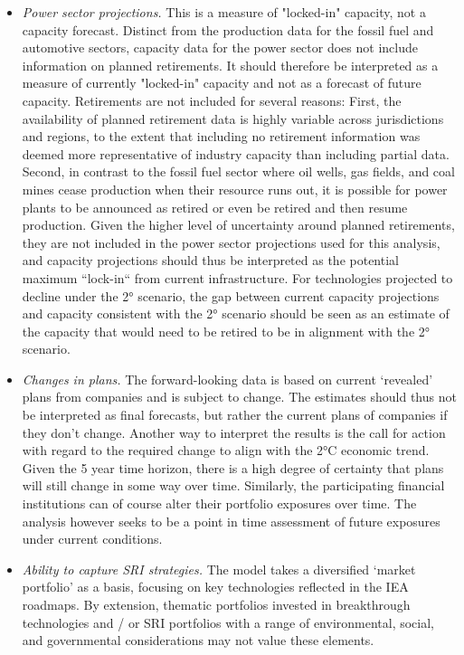 \documentclass[10pt,table,a4]{article}\usepackage[]{graphicx}\usepackage[]{color}
\begin{document}
\begin{multicols}{2}
\begin{itemize}
			\item{\textit{Power sector projections.} This is a measure of "locked-in" capacity, not a capacity forecast. Distinct from the production data for the fossil fuel and automotive sectors, capacity data for the power sector does not include information on planned retirements. It should therefore be interpreted as a measure of currently "locked-in" capacity and not as a forecast of future capacity. Retirements are not included for several reasons: First, the availability of planned retirement data is highly variable across jurisdictions and regions, to the extent that including no retirement information was deemed more representative of industry capacity than including partial data. Second, in contrast to the fossil fuel sector where oil wells, gas fields, and coal mines cease production when their resource runs out, it is possible for power plants to be announced as retired or even be retired and then resume production. Given the higher level of uncertainty around planned retirements, they are not included in the power sector projections used for this analysis, and capacity projections should thus be interpreted as the potential maximum “lock-in“ from current infrastructure. For technologies projected to decline under the 2° scenario, the gap between current capacity projections and capacity consistent with the 2° scenario should be seen as an estimate of the capacity that would need to be retired to be in alignment with the 2° scenario.} 
			
			\item{\textit{Changes in plans. }The forward-looking data is based on current ‘revealed’ plans from companies and is subject to change. The estimates should thus not be interpreted as final forecasts, but rather the current plans of companies if they don’t change. Another way to interpret the results is the call for action with regard to the required change to align with the 2°C economic trend. Given the 5 year time horizon, there is a high degree of certainty that plans will still change in some way over time. Similarly, the participating financial institutions can of course alter their portfolio exposures over time. The analysis however seeks to be a point in time assessment of future exposures under current conditions.}
			\item{\textit{Ability to capture SRI strategies. }The model takes a diversified ‘market portfolio’ as a basis, focusing on key technologies reflected in the IEA roadmaps. By extension, thematic portfolios invested in breakthrough technologies and / or SRI portfolios with a range of environmental, social, and governmental considerations may not value these elements.}
		\end{itemize}
		
		
	\end{multicols}
	\newpage		
	
\end{document}
